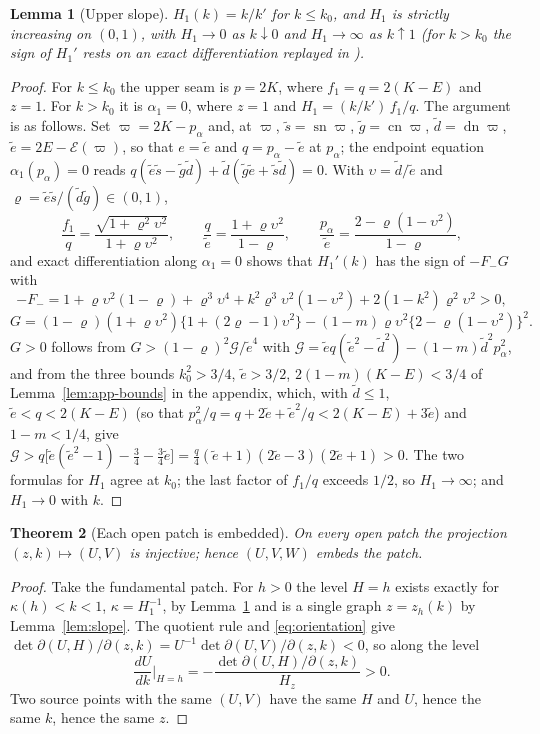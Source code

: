 \documentclass[11pt]{article}
\newtheorem{theorem}{Theorem}[section]
\newtheorem{lemma}[theorem]{Lemma}
\theoremstyle{remark}
\newcommand{\sn}{\operatorname{sn}}
\newcommand{\cn}{\operatorname{cn}}
\newcommand{\dn}{\operatorname{dn}}
\newcommand{\epsi}{\mathcal{E}}
\begin{document}
\begin{lemma}[Upper slope]\label{lem:upper-slope}
$H_1(k)=k/k'$ for $k\le k_0$, and $H_1$ is strictly increasing on $(0,1)$,
with $H_1\to0$ as $k\downarrow0$ and $H_1\to\infty$ as $k\uparrow1$
(for $k>k_0$ the sign of $H_1'$ rests on an exact differentiation replayed
in ).
\end{lemma}
\begin{proof}
For $k\le k_0$ the upper seam is $p=2K$, where $f_1=q=2(K-E)$ and $z=1$.
For $k>k_0$ it is $\alpha_1=0$, where $z=1$ and $H_1=(k/k')\,f_1/q$.  The
argument is as follows.  Set $\varpi=2K-p_\alpha$ and, at $\varpi$,
$\tilde s=\sn\varpi$, $\tilde g=\cn\varpi$, $\tilde d=\dn\varpi$,
$\tilde e=2E-\epsi(\varpi)$, so that $e=\tilde e$ and $q=p_\alpha-\tilde e$ at
$p_\alpha$; the endpoint equation $\alpha_1(p_\alpha)=0$ reads
$q(\tilde e\tilde s-\tilde g\tilde d)+\tilde d(\tilde g\tilde e+\tilde s\tilde d)=0$.
With $\upsilon=\tilde d/\tilde e$ and $\varrho=\tilde e\tilde s/(\tilde d\tilde g)\in(0,1)$,
\[
 \frac{f_1}q=\frac{\sqrt{1+\varrho^2\upsilon^2}}{1+\varrho\upsilon^2},\qquad
 \frac q{\tilde e}=\frac{1+\varrho\upsilon^2}{1-\varrho},\qquad
 \frac{p_\alpha}{\tilde e}=\frac{2-\varrho(1-\upsilon^2)}{1-\varrho},
\]
and exact differentiation along $\alpha_1=0$ shows that $H_1'(k)$ has the
sign of $-F_-G$ with
\[
 -F_-=1+\varrho\upsilon^2(1-\varrho)+\varrho^3\upsilon^4+k^2\varrho^3\upsilon^2(1-\upsilon^2)
 +2(1-k^2)\varrho^2\upsilon^2>0,
\]
\[
 G=(1-\varrho)(1+\varrho\upsilon^2)\{1+(2\varrho-1)\upsilon^2\}
 -(1-m)\varrho\upsilon^2\{2-\varrho(1-\upsilon^2)\}^2 .
\]
$G>0$ follows from $G>(1-\varrho)^2\mathcal G/\tilde e^4$ with
$\mathcal G=\tilde eq(\tilde e^2-\tilde d^2)-(1-m)\tilde d^2p_\alpha^2$, and from
the three bounds $k_0^2>3/4$, $\tilde e>3/2$, $2(1-m)(K-E)<3/4$ of
Lemma~\ref{lem:app-bounds} in the appendix, which, with $\tilde d\le1$,
$\tilde e<q<2(K-E)$ (so that $p_\alpha^2/q=q+2\tilde e+\tilde e^2/q<2(K-E)+3\tilde e$)
and $1-m<1/4$, give
$\mathcal G>q\bigl[\tilde e(\tilde e^2-1)-\tfrac34-\tfrac34\tilde e\bigr]
=\tfrac q4(\tilde e+1)(2\tilde e-3)(2\tilde e+1)>0$.
The two formulas for $H_1$ agree at $k_0$; the last factor of $f_1/q$
exceeds $1/2$, so $H_1\to\infty$; and $H_1\to0$ with $k$.
\end{proof}

\begin{theorem}[Each open patch is embedded]\label{thm:univalence}
On every open patch the projection $(z,k)\mapsto(U,V)$ is injective; hence
$(U,V,W)$ embeds the patch.
\end{theorem}
\begin{proof}
Take the fundamental patch.  For $h>0$ the level $H=h$ exists exactly for
$\kappa(h)<k<1$, $\kappa=H_1^{-1}$, by Lemma~\ref{lem:upper-slope} and is a single graph
$z=z_h(k)$ by Lemma~\ref{lem:slope}.  The quotient rule and
\eqref{eq:orientation} give
$\det\partial(U,H)/\partial(z,k)=U^{-1}\det\partial(U,V)/\partial(z,k)<0$,
so along the level
\[
 \frac{dU}{dk}\Big|_{H=h}=-\frac{\det\partial(U,H)/\partial(z,k)}{H_z}>0 .
\]
Two source points with the same $(U,V)$ have the same $H$ and $U$, hence
the same $k$, hence the same $z$.
\end{proof}
\end{document}
